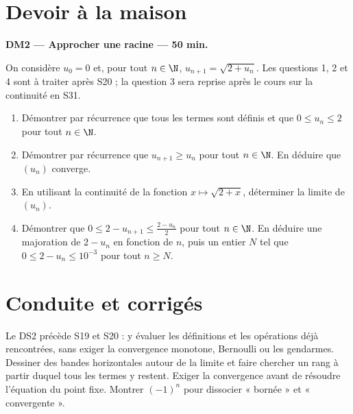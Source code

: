 \mxnewpage
\section{Devoir à la maison}\textbf{DM2 --- Approcher une racine --- 50 min.}\par On considère $u_0=0$ et, pour tout $n\in\N$, $u_{n+1}=\sqrt{2+u_n}$. Les questions 1, 2 et 4 sont à traiter après S20 ; la question 3 sera reprise après le cours sur la continuité en S31.
\begin{enumerate}\item Démontrer par récurrence que tous les termes sont définis et que $0\le u_n\le2$ pour tout $n\in\N$.
\item Démontrer par récurrence que $u_{n+1}\ge u_n$ pour tout $n\in\N$. En déduire que $(u_n)$ converge.
\item En utilisant la continuité de la fonction $x\mapsto\sqrt{2+x}$, déterminer la limite de $(u_n)$.
\item Démontrer que $0\le2-u_{n+1}\le\frac{2-u_n}{2}$ pour tout $n\in\N$. En déduire une majoration de $2-u_n$ en fonction de $n$, puis un entier $N$ tel que $0\le2-u_n\le10^{-3}$ pour tout $n\ge N$.\end{enumerate}

\ifmxteacher\mxnewpage\section{Conduite et corrigés}\begin{teachernote}Le DS2 précède S19 et S20 : y évaluer les définitions et les opérations déjà rencontrées, sans exiger la convergence monotone, Bernoulli ou les gendarmes. Dessiner des bandes horizontales autour de la limite et faire chercher un rang à partir duquel tous les termes y restent. Exiger la convergence avant de résoudre l'équation du point fixe. Montrer $(-1)^n$ pour dissocier « bornée » et « convergente ».\end{teachernote}

